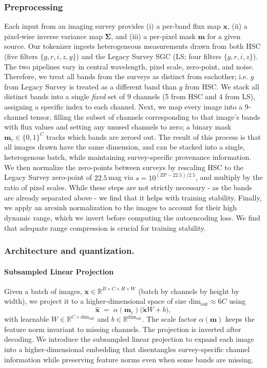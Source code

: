 \documentclass[]{polymathic}
\begin{document}
\subsubsection{Preprocessing} 

Each input from an imaging survey provides (i) a per-band flux map $\mathbf{x}$, (ii) a pixel-wise inverse variance map $\mathbf{\Sigma}$, and (iii) a per-pixel mask $\mathbf{m}$ for a given source. Our tokenizer ingests heterogeneous measurements drawn from both HSC (five filters $\{g,r,i,z,y\}$) and the Legacy Survey SGC (LS; four filters $\{g,r,i,z\}$). The two pipelines vary in central wavelength, pixel scale, zero‑point, and noise. Therefore, we treat all bands from the surveys as distinct from eachother; i.e. $g$ from Legacy Survey is treated as a different band than $g$ from HSC. We stack all distinct bands into a single \emph{fixed} set of 9 channels (5 from HSC and 4 from LS), assigning a specific index to each channel. Next, we map every image into a 9‐channel tensor, filling the subset of channels corresponding to that image’s bands with flux values and setting any unused channels to zero; a binary mask $\mathbf m_c\in\{0,1\}^C$ tracks which bands are zeroed out. The result of this process is that all images drawn have the same dimension, and can be stacked into a single, heterogenous batch, while maintaining survey-specific provenance information. We then normalize the zero-points between surveys by rescaling HSC to the Legacy Survey zero-point of $22.5$\,mag via \(s = 10^{(\mathrm{ZP}-22.5)/2.5}\!\), and multiply by the ratio of pixel scales. While these steps are not strictly necessary - as the bands are already separated above - we find that it helps with training stability. Finally, we apply an $\mathrm{arcsinh}$ normalization to the images to account for their high dynamic range, which we invert before computing the autoencoding loss. We find that adequate range compression is crucial for training stability.


\subsubsection{Architecture and quantization.}

\paragraph{Subsampled Linear Projection}
Given a batch of images, \(\mathbf{x}\!\in\!\mathbb{R}^{B\times C\times H\times W}\) (batch by channels by height by width), we project it to a higher-dimensional space of size \(\mathrm{dim}_\mathrm{out}\approx 6C\) using  
\[
    \hat{\mathbf{x}} \;=\; \alpha(\mathbf{m}_c)\bigl(\tilde{\mathbf{x}}W + b\bigr),
\]
with learnable \(W\!\in\!\mathbb{R}^{C\times\mathrm{dim}_\mathrm{out}}\) and \(b\!\in\!\mathbb{R}^{\mathrm{dim}_\mathrm{out}}\). The scale factor \(\alpha(\mathbf{m})\) keeps the feature norm invariant to missing channels. The projection is inverted after decoding. We introduce the subsampled linear projection to expand each image into a higher-dimensional embedding that disentangles survey-specific channel information while preserving feature norms even when some bands are missing. 
\end{document}
